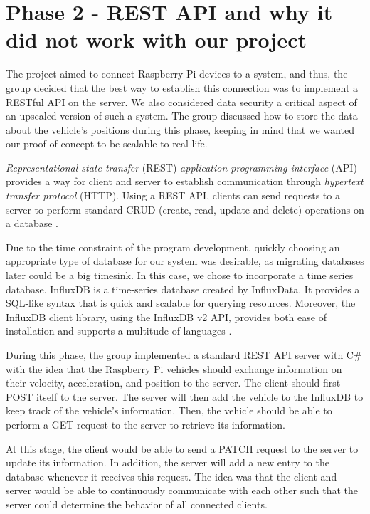 
\section{Phase 2 - REST API and why it did not work with our project}\label{phase2}
The project aimed to connect Raspberry Pi devices to a system, and thus, the group decided that the best way to establish this connection was to implement a RESTful API on the server. We also considered data security a critical aspect of an upscaled version of such a system. The group discussed how to store the data about the vehicle's positions during this phase, keeping in mind that we wanted our proof-of-concept to be scalable to real life.

\emph{Representational state transfer} (REST) \emph{application programming interface} (API) provides a way for client and server to establish communication through \emph{hypertext transfer protocol} (HTTP). Using a REST API, clients can send requests to a server to perform standard CRUD (create, read, update and delete) operations on a database \parencite{rest_api}.

Due to the time constraint of the program development, quickly choosing an appropriate type of database for our system was desirable, as migrating databases later could be a big timesink. In this case, we chose to incorporate a time series database. InfluxDB is a time-series database created by InfluxData. It provides a SQL-like syntax that is quick and scalable for querying resources. Moreover, the InfluxDB client library, using the InfluxDB v2 API, provides both ease of installation and supports a multitude of languages \parencite{influxdb}.

During this phase, the group implemented a standard REST API server with C\# with the idea that the Raspberry Pi vehicles should exchange information on their velocity, acceleration, and position to the server. The client should first POST itself to the server. The server will then add the vehicle to the InfluxDB to keep track of the vehicle's information. Then, the vehicle should be able to perform a GET request to the server to retrieve its information.

At this stage, the client would be able to send a PATCH request to the server to update its information. In addition, the server will add a new entry to the database whenever it receives this request. The idea was that the client and server would be able to continuously communicate with each other such that the server could determine the behavior of all connected clients.

